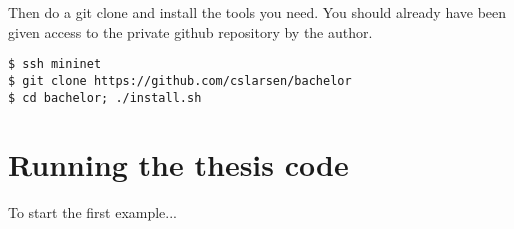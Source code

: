 Then do a git clone and install the tools you need. You should already have
been given access to the private github repository by the author.

\begin{Verbatim}
$ ssh mininet
$ git clone https://github.com/cslarsen/bachelor
$ cd bachelor; ./install.sh
\end{Verbatim}

\section{Running the thesis code}

To start the first example...

